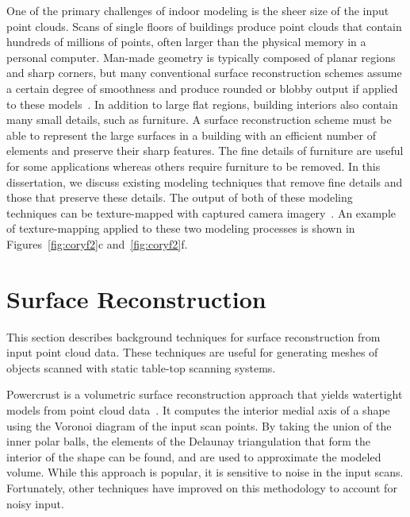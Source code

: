 \documentclass[12pt,onecolumn,oneside]{book}
\begin{document}
One of the primary challenges of indoor modeling is the sheer size of the input point clouds.  Scans of single floors of buildings produce point clouds that contain hundreds of millions of points, often larger than the physical memory in a personal computer.  Man-made geometry is typically composed of planar regions and sharp corners, but many conventional surface reconstruction schemes assume a certain degree of smoothness and produce rounded or blobby output if applied to these models~\cite{Powercrust,OctreeSculpting,Carving,ProgressiveMesh,Poisson,EigencrustShewchuk}.  In addition to large flat regions, building interiors also contain many small details, such as furniture.  A surface reconstruction scheme must be able to represent the large surfaces in a building with an efficient number of elements and preserve their sharp features.  The fine details of furniture are useful for some applications whereas others require furniture to be removed.  In this dissertation, we discuss existing modeling techniques that remove fine details and those that preserve these details.  The output of both of these modeling techniques can be texture-mapped with captured camera imagery~\cite{Cheng14}.  An example of texture-mapping applied to these two modeling processes is shown in Figures~\ref{fig:coryf2}c and~\ref{fig:coryf2}f.

\section{Surface Reconstruction}
\label{sec:surf_recon_background}

This section describes background techniques for surface reconstruction from input point cloud data.  These techniques are useful for generating meshes of objects scanned with static table-top scanning systems.

Powercrust is a volumetric surface reconstruction approach that yields watertight models from point cloud data~\cite{Powercrust}.  It computes the interior medial axis of a shape using the Voronoi diagram of the input scan points.  By taking the union of the inner polar balls, the elements of the Delaunay triangulation that form the interior of the shape can be found, and are used to approximate the modeled volume.  While this approach is popular, it is sensitive to noise in the input scans.  Fortunately, other techniques have improved on this methodology to account for noisy input.
\end{document}
